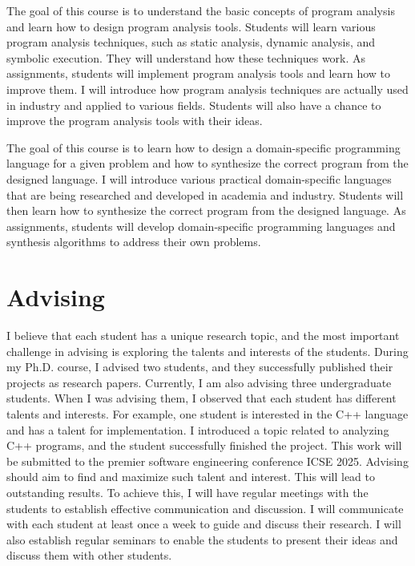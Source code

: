 \documentclass[11pt]{article}
\newcommand{\myparagraph}[1]{\medskip\noindent{\it \textbf{#1.}}}
\begin{document}
\myparagraph{Program Analysis}
The goal of this course is to understand the basic concepts of program analysis and learn how to design program analysis tools. 
%
Students will learn various program analysis techniques, such as static analysis, dynamic analysis, and symbolic execution. They will understand how these techniques work.
%
As assignments, students will implement program analysis tools and learn how to improve them. 
%
I will introduce how program analysis techniques are actually used in industry and applied to various fields.
%
Students will also have a chance to improve the program analysis tools with their ideas.




\myparagraph{Program Synthesis}
The goal of this course is to learn how to design a domain-specific programming language for a given problem and how to synthesize the correct program from the designed language. 
% 
I will introduce various practical domain-specific languages that are being researched and developed in academia and industry.
% 
Students will then learn how to synthesize the correct program from the designed language.
%
As assignments, students will develop domain-specific programming languages and synthesis algorithms to address their own problems.






\section{Advising}
I believe that each student has a unique research topic, and the most important challenge in advising is exploring the talents and interests of the students.
% 
During my Ph.D. course, I advised two students, and they successfully published their projects as research papers. 
% 
Currently, I am also advising three undergraduate students.
% 
When I was advising them, I observed that each student has different talents and interests.
% 
For example, one student is interested in the C++ language and has a talent for implementation.
%
I introduced a topic related to analyzing C++ programs, and the student successfully finished the project. 
%
This work will be submitted to the premier software engineering conference ICSE 2025.
% 
Advising should aim to find and maximize such talent and interest.
%
This will lead to outstanding results.
% 
To achieve this, I will have regular meetings with the students to establish effective communication and discussion.
%  
I will communicate with each student at least once a week to guide and discuss their research.
%
I will also establish regular seminars to enable the students to present their ideas and discuss them with other students.
\end{document}
